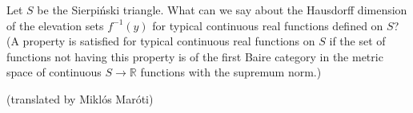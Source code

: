 Let $S$ be the Sierpiński triangle. What can we say about the Hausdorff dimension of the elevation sets $f^{-1}(y)$ for typical continuous real functions defined on $S$? (A property is satisfied for typical continuous real functions on $S$ if the set of functions not having this property is of the first Baire category in the metric space of continuous $S\rightarrow\mathbb{R}$ functions with the supremum norm.)

(translated by Miklós Maróti)
